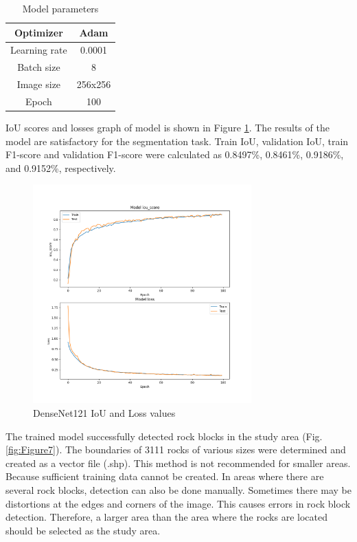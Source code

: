 \documentclass[a4paper,fleqn]{cas-sc}
\begin{document}
\begin{table}
	\centering
	\caption{Model parameters}
	\label{tab:Table1}
	\begin{tabular}{ |c|c|} 
		\hline
		Optimizer&Adam\\ 
		\hline 
		Learning rate&0.0001\\
		\hline
		Batch size&8\\
		\hline
		Image size&256x256\\
		\hline
		Epoch&100\\
		\hline
	\end{tabular} 
\end{table}


IoU scores and losses graph of model is shown in Figure \ref{fig:Figure6}. The results of the model are satisfactory for the segmentation task. Train IoU, validation IoU, train F1-score and validation F1-score were calculated as 0.8497\%, 0.8461\%, 0.9186\%, and 0.9152\%, respectively.

\begin{figure}
	\centering
	\includegraphics[width=0.75\textwidth]{figures/fig6.png}
	\caption{DenseNet121 IoU and Loss values}
	\label{fig:Figure6}
\end{figure}

The trained model successfully detected rock blocks in the study area (Fig. \ref{fig:Figure7}). The boundaries of 3111 rocks of various sizes were determined and created as a vector file (.shp). This method is not recommended for smaller areas. Because sufficient training data cannot be created. In areas where there are several rock blocks, detection can also be done manually. 
Sometimes there may be distortions at the edges and corners of the image. This causes errors in rock block detection. Therefore, a larger area than the area where the rocks are located should be selected as the study area.
\end{document}
